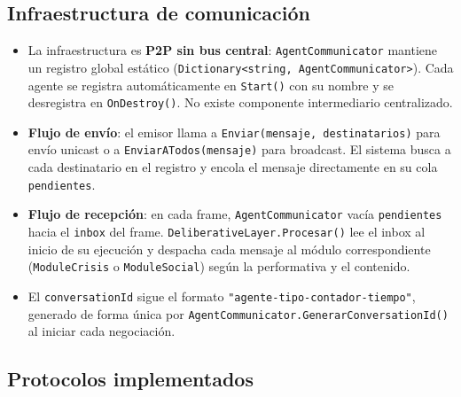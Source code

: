 \documentclass[a4paper,12pt]{article}
\begin{document}
\subsection{Infraestructura de comunicación}

\begin{itemize}

    \item La infraestructura es \textbf{P2P sin bus central}:
    \texttt{AgentCommunicator} mantiene un registro global estático
    (\texttt{Dictionary<string, AgentCommunicator>}). Cada agente se registra
    automáticamente en \texttt{Start()} con su nombre y se desregistra en
    \texttt{OnDestroy()}. No existe componente intermediario centralizado.

    \item \textbf{Flujo de envío}: el emisor llama a
    \texttt{Enviar(mensaje, destinatarios)} para envío unicast o a
    \texttt{EnviarATodos(mensaje)} para broadcast. El sistema busca a cada
    destinatario en el registro y encola el mensaje directamente en su cola
    \texttt{pendientes}.

    \item \textbf{Flujo de recepción}: en cada frame,
    \texttt{AgentCommunicator} vacía \texttt{pendientes} hacia el
    \texttt{inbox} del frame. \texttt{DeliberativeLayer.Procesar()} lee el
    inbox al inicio de su ejecución y despacha cada mensaje al módulo
    correspondiente (\texttt{ModuleCrisis} o \texttt{ModuleSocial}) según la
    performativa y el contenido.

    \item El \texttt{conversationId} sigue el formato
    \texttt{"agente-tipo-contador-tiempo"}, generado de forma única por
    \texttt{AgentCommunicator.GenerarConversationId()} al iniciar cada
    negociación.

\end{itemize}


\subsection{Protocolos implementados}
\end{document}

